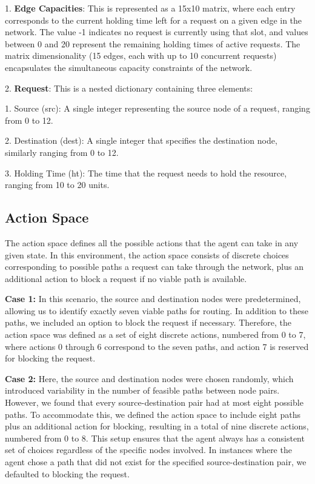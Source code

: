 \documentclass[conference]{IEEEtran}
\begin{document}
1. \textbf{Edge Capacities}: This is represented as a 15x10 matrix, where each entry corresponds to the current holding time left for a request on a given edge in the network. The value -1 indicates no request is currently using that slot, and values between 0 and 20 represent the remaining holding times of active requests. The matrix dimensionality (15 edges, each with up to 10 concurrent requests) encapsulates the simultaneous capacity constraints of the network.

2. \textbf{Request}: This is a nested dictionary containing three elements:

1. Source (src): A single integer representing the source node of a request, ranging from 0 to 12.

2. Destination (dest): A single integer that specifies the destination node, similarly ranging from 0 to 12.

3. Holding Time (ht): The time that the request needs to hold the resource, ranging from 10 to 20 units.

\subsection{Action Space}

The action space defines all the possible actions that the agent can take in any given state. In this environment, the action space consists of discrete choices corresponding to possible paths a request can take through the network, plus an additional action to block a request if no viable path is available.

\textbf{Case 1:} In this scenario, the source and destination nodes were predetermined, allowing us to identify exactly seven viable paths for routing. In addition to these paths, we included an option to block the request if necessary. Therefore, the action space was defined as a set of eight discrete actions, numbered from 0 to 7, where actions 0 through 6 correspond to the seven paths, and action 7 is reserved for blocking the request.

\textbf{Case 2:} Here, the source and destination nodes were chosen randomly, which introduced variability in the number of feasible paths between node pairs. However, we found that every source-destination pair had at most eight possible paths. To accommodate this, we defined the action space to include eight paths plus an additional action for blocking, resulting in a total of nine discrete actions, numbered from 0 to 8. This setup ensures that the agent always has a consistent set of choices regardless of the specific nodes involved. In instances where the agent chose a path that did not exist for the specified source-destination pair, we defaulted to blocking the request. 
\end{document}
